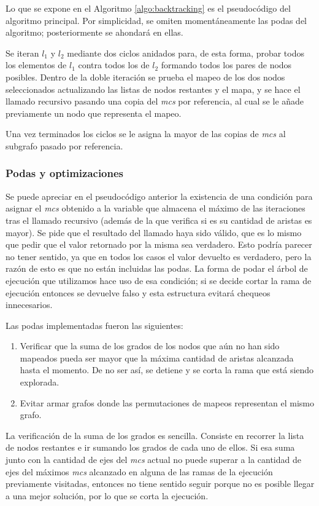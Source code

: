 Lo que se expone en el Algoritmo \ref{algo:backtracking} es el pseudocódigo
del algoritmo principal. Por simplicidad, se omiten momentáneamente las podas
del algoritmo; posteriormente se ahondará en ellas.

Se iteran $l_1$ y $l_2$
mediante dos ciclos anidados para, de esta forma, probar todos los elementos de
$l_1$ contra todos los de $l_2$ formando todos los pares de nodos posibles.
Dentro de la doble iteración se prueba el mapeo de los dos nodos seleccionados
actualizando las listas de nodos restantes y el mapa, y se hace el llamado
recursivo pasando una copia del \textit{mcs} por referencia, al cual se le
añade previamente un nodo que representa el mapeo.

Una vez terminados los ciclos se le asigna la mayor de las copias de
\textit{mcs} al subgrafo pasado por referencia.

\subsubsection{Podas y optimizaciones}

Se puede apreciar en el pseudocódigo anterior la existencia de una condición
para asignar el \textit{mcs} obtenido a la variable que almacena el máximo de
las iteraciones tras el llamado recursivo (además de la que verifica si es
su cantidad de aristas es mayor). Se pide que el resultado del llamado haya sido
válido, que es lo mismo que pedir que el valor retornado por la misma sea
verdadero. Esto podría parecer no tener sentido, ya que en todos los casos el valor
devuelto es verdadero, pero la razón de esto es que no están incluidas las podas. La
forma de podar el árbol de ejecución que utilizamos hace uso de esa condición;
si se decide cortar la rama de ejecución entonces se devuelve falso y esta
estructura evitará chequeos innecesarios.

Las podas implementadas fueron las siguientes:

\begin{enumerate}
\item Verificar que la suma de los grados de los nodos que aún no han sido
mapeados pueda ser mayor que la máxima cantidad de aristas alcanzada hasta
el momento. De no ser así, se detiene y se corta la rama que está siendo
explorada.
\item Evitar armar grafos donde las permutaciones de mapeos representan el
mismo grafo.
\end{enumerate}

La verificación de la suma de los grados es sencilla. Consiste en recorrer la
lista de nodos restantes e ir sumando los grados de cada uno de ellos. Si esa
suma junto con la cantidad de ejes del \textit{mcs} actual no puede superar
a la cantidad de ejes del máximos \textit{mcs} alcanzado en alguna de las
ramas de la ejecución previamente visitadas, entonces no tiene sentido seguir
porque no es posible llegar a una mejor solución, por lo que se corta la
ejecución.

